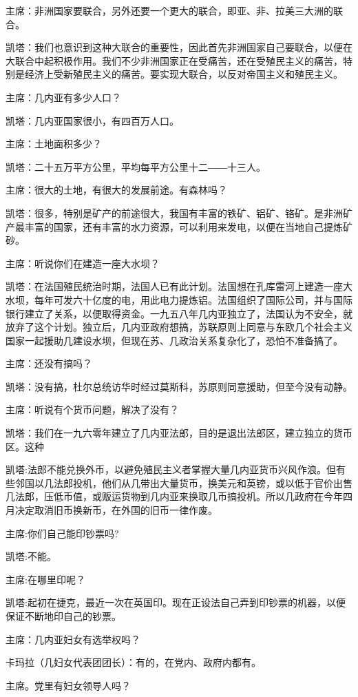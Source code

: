主席：非洲国家要联合，另外还要一个更大的联合，即亚、非、拉美三大洲的联合。

凯塔：我们也意识到这种大联合的重要性，因此首先非洲国家自己要联合，以便在大联合中起积极作用。我们不少非洲国家正在受痛苦，还在受殖民主义的痛苦，特别是经济上受新殖民主义的痛苦。要实现大联合，以反对帝国主义和殖民主义。

主席：几内亚有多少人口？

凯塔：几内亚国家很小，有四百万人口。

主席：土地面积多少？

凯塔：二十五万平方公里，平均每平方公里十二――十三人。

主席：很大的土地，有很大的发展前途。有森林吗？

凯塔：很多，特别是矿产的前途很大，我国有丰富的铁矿、铝矿、铬矿。是非洲矿产最丰富的国家，还有丰富的水力资源，可以利用来发电，以便在当地自己提炼矿砂。

主席：听说你们在建造一座大水坝？

凯塔：在法国殖民统治时期，法国人已有此计划。法国想在孔库雷河上建造一座大水坝，每年可发六十亿度的电，用此电力提炼铝。法国组织了国际公司，并与国际银行建立了关系，以便取得资金。一九五八年几内亚独立了，法国认为不安全，就放弃了这个计划。独立后，几内亚政府想搞，苏联原则上同意与东欧几个社会主义国家一起援助几建设水坝，但现在苏、几政治关系复杂化了，恐怕不准备搞了。

主席：还没有搞吗？

凯塔：没有搞，杜尔总统访华时经过莫斯科，苏原则同意援助，但至今没有动静。

主席：听说有个货币问题，解决了没有？

凯塔：我们在一九六零年建立了几内亚法郎，目的是退出法郎区，建立独立的货币区。这种

凯塔:法郎不能兑换外币，以避免殖民主义者掌握大量几内亚货币兴风作浪。但有些邻国以几法郎投机，他们从几带出大量货币，换美元和英镑，或以低于官价出售几法郎，压低币值，或贩运货物到几内亚来换取几币搞投机。所以几政府在今年四月决定取消旧币换新币，在外国的旧币一律作废。

主席:你们自己能印钞票吗?

凯塔:不能。

主席:在哪里印呢？

凯塔:起初在捷克，最近一次在英国印。现在正设法自己弄到印钞票的机器，以便保证不断地印自己的钞票。

主席：几内亚妇女有选举权吗？

卡玛拉（几妇女代表团团长）：有的，在党内、政府内都有。

主席。党里有妇女领导人吗？

